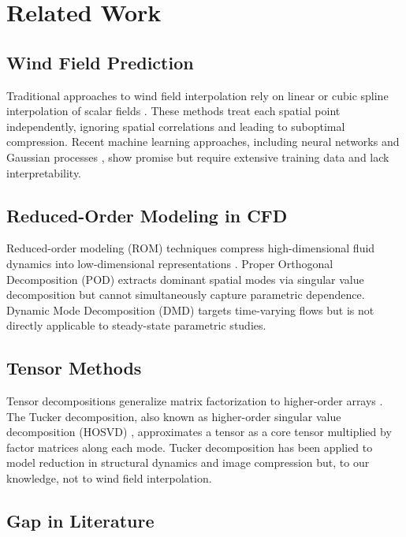 \documentclass[conference]{IEEEtran}
\begin{document}
\section{Related Work}

\subsection{Wind Field Prediction}

Traditional approaches to wind field interpolation rely on linear or cubic spline interpolation of scalar fields \cite{ferreira2009}. These methods treat each spatial point independently, ignoring spatial correlations and leading to suboptimal compression. Recent machine learning approaches, including neural networks \cite{zhu2018} and Gaussian processes \cite{moser2015}, show promise but require extensive training data and lack interpretability.

\subsection{Reduced-Order Modeling in CFD}

Reduced-order modeling (ROM) techniques compress high-dimensional fluid dynamics into low-dimensional representations \cite{benner2015}. Proper Orthogonal Decomposition (POD) extracts dominant spatial modes via singular value decomposition \cite{berkooz1993} but cannot simultaneously capture parametric dependence. Dynamic Mode Decomposition (DMD) targets time-varying flows \cite{schmid2010} but is not directly applicable to steady-state parametric studies.

\subsection{Tensor Methods}

Tensor decompositions generalize matrix factorization to higher-order arrays \cite{kolda2009}. The Tucker decomposition, also known as higher-order singular value decomposition (HOSVD) \cite{delathauwer2000}, approximates a tensor as a core tensor multiplied by factor matrices along each mode. Tucker decomposition has been applied to model reduction in structural dynamics \cite{grasedyck2013} and image compression \cite{oseledets2011} but, to our knowledge, not to wind field interpolation.

\subsection{Gap in Literature}
\end{document}

